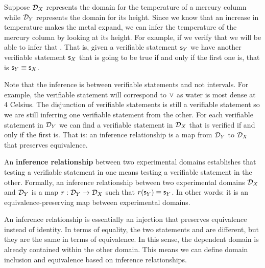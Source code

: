 \documentclass[11pt,letterpaper,fleqn]{memoir} %
\begin{document}
Suppose $\mathcal{D}_X$ represents the domain for the temperature of a mercury column while $\mathcal{D}_Y$ represents the domain for its height. Since we know that an increase in temperature makes the metal expand, we can infer the temperature of the mercury column by looking at its height. For example, if we verify that  we will be able to infer that . That is, given a verifiable statement $\mathsf{s}_Y$ we have another verifiable statement $\mathsf{s}_X$ that is going to be true if and only if the first one is, that is $\mathsf{s}_Y\equiv\mathsf{s}_X$.

Note that the inference is between verifiable statements and not intervals. For example, the verifiable statement  will correspond to $\vee$ as water is most dense at 4 Celsius. The disjunction of verifiable statements is still a verifiable statement so we are still inferring one verifiable statement from the other. For each verifiable statement in $\mathcal{D}_Y$ we can find a verifiable statement in $\mathcal{D}_X$ that is verified if and only if the first is. That is: an inference relationship is a map from $\mathcal{D}_Y$ to $\mathcal{D}_X$ that preserves equivalence.

\begin{mathSection}
	\begin{defn}
		An \textbf{inference relationship} between two experimental domains establishes that testing a verifiable statement in one means testing a verifiable statement in the other. Formally, an inference relationship between two experimental domains $\mathcal{D}_X$ and $\mathcal{D}_Y$ is a map $r: \mathcal{D}_Y \to \mathcal{D}_X$ such that $r(\mathsf{s}_Y) \equiv \mathsf{s}_Y$. In other words: it is an equivalence-preserving map between experimental domains.
	\end{defn}
\end{mathSection}

An inference relationship is essentially an injection that preserves equivalence instead of identity. In terms of equality, the two statements  and  are different, but they are the same in terms of equivalence. In this sense, the dependent domain is already contained within the other domain. This means we can define domain inclusion and equivalence based on inference relationships.
\end{document}
